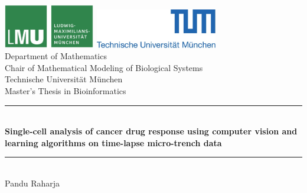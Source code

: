 \documentclass[pdftex,12pt,a4paper]{report}
\newcommand{\HRule}{\rule{\linewidth}{0.5mm}}
\begin{document}
\begin{titlepage}

\sffamily

\begin{center}


\includegraphics[width=0.3\textwidth]{logo2.jpg}
\hfill
\includegraphics[width=0.4\textwidth]{logo1.jpg}  
\\[5cm]

{\Large Department of Mathematics}\\[0.5cm]
{\Large Chair of Mathematical Modeling of Biological Systems}\\[0.5cm]
{Technische Universit\"at M\"unchen}\\[2cm]
{\Large Master's Thesis in Bioinformatics}\\[1.5cm]

\HRule \\[0.4cm]
{ \huge \bfseries Single-cell analysis of cancer drug response using computer vision and learning algorithms on time-lapse micro-trench data}\\[0.4cm]

\HRule \\[1.5cm]

{\Large Pandu Raharja}\\[2.5cm]

\vfill
\end{center}
\end{titlepage}
\end{document}

